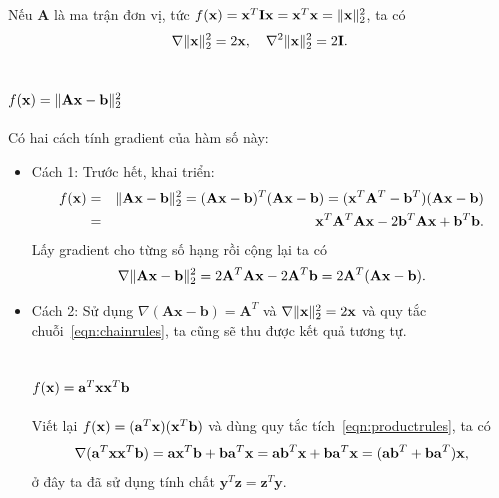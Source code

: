 Nếu $\mathbf{A}$ là ma trận đơn vị, tức $f(\mathbf{x}) = \mathbf{x}^T\mathbf{Ix} = \mathbf{x}^T\mathbf{x} = \|\mathbf{x}\|_2^2$, ta có
\begin{equation}
\nabla \|\mathbf{x}\|_2^2 = 2\mathbf{x},~~~
\nabla^2 \|\mathbf{x}\|_2^2 = 2\mathbf{I}.
\end{equation}


\subsection{$f(\mathbf{x}) = \|\mathbf{Ax} - \mathbf{b}\|_2^2 $}
\label{sec:gr_squarenorm2}
Có hai cách tính gradient của hàm số này:
\begin{itemize}
\item {Cách 1:} Trước hết, khai triển:
\begin{eqnarray}
\nonumber
f(\mathbf{x}) &=& \|\mathbf{Ax} - \mathbf{b}\|_2^2 = (\mathbf{Ax} - \mathbf{b})^T(\mathbf{Ax} - \mathbf{b}) = (\mathbf{x}^T\mathbf{A}^T - \mathbf{b}^T) (\mathbf{Ax} - \mathbf{b}) \\\ \nonumber
&=& \mathbf{x}^T\mathbf{A}^T\mathbf{Ax} - 2 \mathbf{b}^T\mathbf{Ax} + \mathbf{b}^T\mathbf{b}.
\end{eqnarray}
Lấy gradient cho từng số hạng rồi cộng lại ta có
\begin{equation*}
\nabla \|\mathbf{Ax} - \mathbf{b}\|_2^2 = 2\mathbf{A}^T\mathbf{A}\mathbf{x} - 2\mathbf{A}^T\mathbf{b} = 2\mathbf{A}^T(\mathbf{Ax} - \mathbf{b}).
\end{equation*}

\item {Cách 2:} Sử dụng $\nabla (\mathbf{Ax} - \mathbf{b}) =
\mathbf{A}^T$ và $\nabla \|\mathbf{x}\|_2^2 = 2\mathbf{x}$ và quy tắc chuỗi~\eqref{eqn:chainrules}, ta cũng sẽ thu được kết quả tương tự.


\subsection{$f(\mathbf{x}) = \mathbf{a}^T\mathbf{x}\mathbf{x}^T\mathbf{b}$}
Viết lại $f(\mathbf{x}) = (\mathbf{a}^T\mathbf{x})(\mathbf{x}^T\mathbf{b})$ và dùng
quy tắc tích~\eqref{eqn:productrules}, ta có
\begin{equation*}
\nabla (\mathbf{a}^T\mathbf{x}\mathbf{x}^T\mathbf{b}) = \mathbf{a} \mathbf{x}^T\mathbf{b} +
\mathbf{b}\mathbf{a}^T\mathbf{x} = \mathbf{ab}^T\mathbf{x} + \mathbf{b}\mathbf{a}^T\mathbf{x}=
(\mathbf{ab}^T + \mathbf{ba}^T)\mathbf{x},
\end{equation*}
ở đây ta đã sử dụng tính chất $\mathbf{y}^T\mathbf{z} = \mathbf{z}^T\mathbf{y}$.
\end{itemize}

